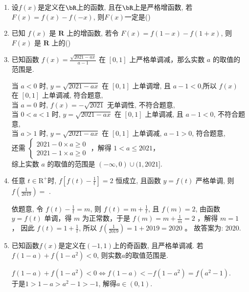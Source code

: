 \begin{enumerate}
\item 设$f(x)$是定义在$\bR$上的函数, 且在$\bR$上是严格增函数, 若$F(x)=f(x)-f(-x)$, 则$F(x)$一定是\dotfill()



\item 已知 $f(x)$ 是 $\mathbf{R}$ 上的增函数, 若令 $F(x)=f(1-x)-f(1+x)$, 则 $F(x)$ 是 $\mathbf{R}$ 上的\dotfill()


\item 已知函数 $f(x)=\frac{\sqrt{2021-a x}}{a-1}$ 在 $[0,1]$ 上严格单调减，那么实数 $a$ 的取值的范围是\blkda[3]{$(-\infty, 0) \cup(1,2021]$}.
\begin{jieda}
当 $a<0$ 时, $y=\sqrt{2021-a x}$ 在 $[0,1]$ 上单调增, 且 $a-1<0$,所以 $f(x)$ 在 $[0,1]$ 上单调减, 符合题意,\\
当 $a=0$ 时, $f(x)=-\sqrt{2021}$ 无单调性, 不符合题意,\\
当 $0<a<1$ 时, $y=\sqrt{2021-a x}$ 在 $[0,1]$ 上单调减, 且 $a-1<0$, 不符合题意,\\
当 $a>1$ 时, $y=\sqrt{2021-a x}$ 在 $[0,1]$ 上单调减, $a-1>0$, 符合题意,\\
还需 $\left\{\begin{array}{l}2021-0 \times a \geq 0 \\ 2021-1 \times a \geq 0\end{array}\right.$ ，解得 $1<a \leq 2021 ，$\\
综上实数 $a$ 的取值的范围是 $(-\infty, 0) \cup(1,2021]$.
\end{jieda}

\item 任意 $t \in \mathrm{R}^{+}$时, $f\left[f(t)-\frac{1}{t}\right]=2$ 恒成立, 且函数 $y=f(t)$ 严格单调, 则 $f\left(\frac{1}{2019}\right)=$ .
\begin{jieda}
依题意, 令 $f(t)-\frac{1}{t}=m$, 则 $f(t)=m+\frac{1}{t}$, 且 $f(m)=2$,
由函数 $y=f(t)$ 单调，得 $m$ 为正常数，于是 $f(m)=m+\frac{1}{m}=2$ ，解得 $m=1$ ，
因此 $f(t)=1+\frac{1}{t}$, 所以 $f\left(\frac{1}{2019}\right)=1+2019=2020$ 。
故答案为: 2020.
\end{jieda}


\item 已知函数$f(x)$是定义在$(-1,1)$上的奇函数, 且严格单调减. 若$f(1-a)+f(1-a^2)<0$, 则实数$a$的取值范围是. 
\begin{jieda}
$f(1-a)+f(1-a^2)<0\iff f(1-a)<-f(1-a^2)=f(a^2-1)$. \\
于是$1>1-a>a^2-1>-1$, 解得$a\in(0,1)$. 
\end{jieda}




\end{enumerate}
